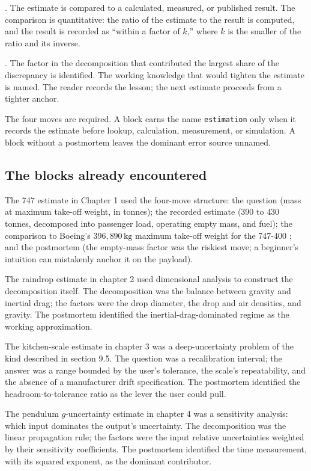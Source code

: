 . The estimate is compared
to a calculated, measured, or published result. The comparison is
quantitative: the ratio of the estimate to the result is computed,
and the result is recorded as ``within a factor of $k$,'' where
$k$ is the smaller of the ratio and its inverse.

. The factor in the decomposition that
contributed the largest share of the discrepancy is identified.
The working knowledge that would tighten the estimate is named.
The reader records the lesson; the next estimate proceeds from a
tighter anchor.

The four moves are required. A block earns the name \verb|estimation|
only when it records the estimate before lookup, calculation,
measurement, or simulation. A block without a postmortem leaves the
dominant error source unnamed.

\subsection{The blocks already encountered}

The 747 estimate in Chapter 1 used the four-move structure: the
question (mass at maximum take-off weight, in tonnes); the recorded
estimate ($390$ to $430$ tonnes, decomposed into passenger load,
operating empty mass, and fuel); the comparison to Boeing's
$396{,}890 \,\si{\kilogram}$ maximum take-off weight for the 747-400
\cite{web:boeing-commercial-reference}; and the postmortem (the
empty-mass factor was the riskiest move; a beginner's intuition can
mistakenly anchor it on the payload).

The raindrop estimate in chapter 2 used dimensional analysis to
construct the decomposition itself. The decomposition was the
balance between gravity and inertial drag; the factors were the
drop diameter, the drop and air densities, and gravity. The
postmortem identified the inertial-drag-dominated regime as the
working approximation.

The kitchen-scale estimate in chapter 3 was a deep-uncertainty
problem of the kind described in section 9.5. The question was a
recalibration interval; the answer was a range bounded by the
user's tolerance, the scale's repeatability, and the absence of a
manufacturer drift specification. The postmortem identified the
headroom-to-tolerance ratio as the lever the user could pull.

The pendulum $g$-uncertainty estimate in chapter 4 was a
sensitivity analysis: which input dominates the output's
uncertainty. The decomposition was the linear propagation rule;
the factors were the input relative uncertainties weighted by
their sensitivity coefficients. The postmortem identified the
time measurement, with its squared exponent, as the dominant
contributor.

